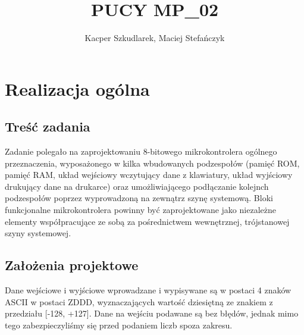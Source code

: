 \documentclass[a4paper,12pt]{report}
\author{Kacper Szkudlarek, Maciej Stefańczyk}
\title{PUCY MP\_02}
\begin{document}
\maketitle

\tableofcontents



\chapter{Realizacja ogólna}

\section{Treść zadania}

Zadanie polegało na zaprojektowaniu 8-bitowego mikrokontrolera ogólnego przeznaczenia, wyposażonego w kilka wbudowanych podzespołów (pamięć ROM, pamięć RAM, układ wejściowy wczytujący dane z klawiatury, układ wyjściowy drukujący dane na drukarce) oraz umożliwiającego podłączanie kolejnch podzespołów poprzez wyprowadzoną na zewnątrz szynę systemową. Bloki funkcjonalne mikrokontrolera powinny być zaprojektowane jako niezależne elementy współpracujące ze sobą za pośrednictwem wewnętrznej, trójstanowej szyny systemowej.

\section{Założenia projektowe}
Dane wejściowe i wyjściowe wprowadzane i wypisywane są w postaci 4 znaków ASCII w postaci ZDDD, wyznaczających wartość dziesiętną ze znakiem z przedziału [-128, +127]. Dane na wejściu podawane są bez błędów, jednak mimo tego zabezpieczyliśmy się przed podaniem liczb spoza zakresu.
\end{document}
